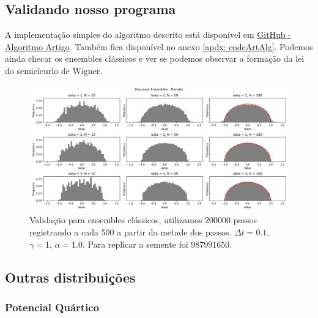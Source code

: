 \subsection{Validando nosso programa}

A implementação simples do algoritmo descrito está disponível em \hyperref[https://github.com/Joao-vap/RMT-Code/blob/main/ArticleAlg/HKMC.f]{GitHub - Algoritmo Artigo}. Também fica disponível no anexo \ref{apdx: codeArtAlg}. Podemos ainda checar os ensembles clássicos e ver se podemos observar a formação da lei do semicícurlo de Wigner.

\begin{figure}
	\includegraphics[scale=0.45]{images/validationArticleAlg}
	\caption{Validação para ensembles clássicos, utilizamos $200000$ passos registrando a cada $500$ a partir da metade dos passos. $\Delta t = 0.1$, $\gamma = 1$, $\alpha = 1.0$. Para replicar a semente foi $987991650$.}
\end{figure}

\subsection{Outras distribuições}

\subsubsection{Potencial Quártico}

